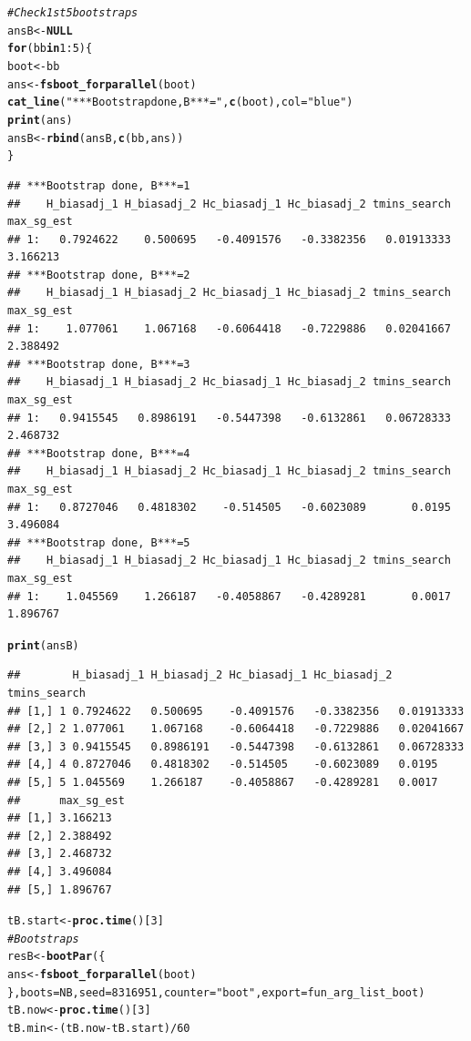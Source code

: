 \documentclass[12pt]{article}
\makeatletter
\newcommand{\hlnum}[1]{\textcolor[rgb]{0.686,0.059,0.569}{#1}}%
\newcommand{\hlstr}[1]{\textcolor[rgb]{0.192,0.494,0.8}{#1}}%
\newcommand{\hlcom}[1]{\textcolor[rgb]{0.678,0.584,0.686}{\textit{#1}}}%
\newcommand{\hlopt}[1]{\textcolor[rgb]{0,0,0}{#1}}%
\newcommand{\hlstd}[1]{\textcolor[rgb]{0.345,0.345,0.345}{#1}}%
\newcommand{\hlkwa}[1]{\textcolor[rgb]{0.161,0.373,0.58}{\textbf{#1}}}%
\newcommand{\hlkwb}[1]{\textcolor[rgb]{0.69,0.353,0.396}{#1}}%
\newcommand{\hlkwc}[1]{\textcolor[rgb]{0.333,0.667,0.333}{#1}}%
\newcommand{\hlkwd}[1]{\textcolor[rgb]{0.737,0.353,0.396}{\textbf{#1}}}%
\newenvironment{kframe}{%
 \def\at@end@of@kframe{}%
 \ifinner\ifhmode%
  \def\at@end@of@kframe{\end{minipage}}%
  \begin{minipage}{\columnwidth}%
 \fi\fi%
 \def\FrameCommand##1{\hskip\@totalleftmargin \hskip-\fboxsep
 \colorbox{shadecolor}{##1}\hskip-\fboxsep
     \hskip-\linewidth \hskip-\@totalleftmargin \hskip\columnwidth}%
 \MakeFramed {\advance\hsize-\width
   \@totalleftmargin\z@ \linewidth\hsize
   \@setminipage}}%
 {\par\unskip\endMakeFramed%
 \at@end@of@kframe}
\newenvironment{knitrout}{}{} %
\makeatother
\begin{document}
\begin{knitrout}
\begin{kframe}
\begin{alltt}
\hlcom{# Check 1st 5 bootstraps}
\hlstd{ansB} \hlkwb{<-} \hlkwa{NULL}
\hlkwa{for} \hlstd{(bb} \hlkwa{in} \hlnum{1}\hlopt{:}\hlnum{5}\hlstd{) \{}
    \hlstd{boot} \hlkwb{<-} \hlstd{bb}
    \hlstd{ans} \hlkwb{<-} \hlkwd{fsboot_forparallel}\hlstd{(boot)}
    \hlkwd{cat_line}\hlstd{(}\hlstr{"***Bootstrap done, B***="}\hlstd{,} \hlkwd{c}\hlstd{(boot),} \hlkwc{col} \hlstd{=} \hlstr{"blue"}\hlstd{)}
    \hlkwd{print}\hlstd{(ans)}
    \hlstd{ansB} \hlkwb{<-} \hlkwd{rbind}\hlstd{(ansB,} \hlkwd{c}\hlstd{(bb, ans))}
\hlstd{\}}
\end{alltt}
\begin{verbatim}
## ***Bootstrap done, B***=1
##    H_biasadj_1 H_biasadj_2 Hc_biasadj_1 Hc_biasadj_2 tmins_search max_sg_est
## 1:   0.7924622    0.500695   -0.4091576   -0.3382356   0.01913333   3.166213
## ***Bootstrap done, B***=2
##    H_biasadj_1 H_biasadj_2 Hc_biasadj_1 Hc_biasadj_2 tmins_search max_sg_est
## 1:    1.077061    1.067168   -0.6064418   -0.7229886   0.02041667   2.388492
## ***Bootstrap done, B***=3
##    H_biasadj_1 H_biasadj_2 Hc_biasadj_1 Hc_biasadj_2 tmins_search max_sg_est
## 1:   0.9415545   0.8986191   -0.5447398   -0.6132861   0.06728333   2.468732
## ***Bootstrap done, B***=4
##    H_biasadj_1 H_biasadj_2 Hc_biasadj_1 Hc_biasadj_2 tmins_search max_sg_est
## 1:   0.8727046   0.4818302    -0.514505   -0.6023089       0.0195   3.496084
## ***Bootstrap done, B***=5
##    H_biasadj_1 H_biasadj_2 Hc_biasadj_1 Hc_biasadj_2 tmins_search max_sg_est
## 1:    1.045569    1.266187   -0.4058867   -0.4289281       0.0017   1.896767
\end{verbatim}
\begin{alltt}
\hlkwd{print}\hlstd{(ansB)}
\end{alltt}
\begin{verbatim}
##        H_biasadj_1 H_biasadj_2 Hc_biasadj_1 Hc_biasadj_2 tmins_search
## [1,] 1 0.7924622   0.500695    -0.4091576   -0.3382356   0.01913333  
## [2,] 2 1.077061    1.067168    -0.6064418   -0.7229886   0.02041667  
## [3,] 3 0.9415545   0.8986191   -0.5447398   -0.6132861   0.06728333  
## [4,] 4 0.8727046   0.4818302   -0.514505    -0.6023089   0.0195      
## [5,] 5 1.045569    1.266187    -0.4058867   -0.4289281   0.0017      
##      max_sg_est
## [1,] 3.166213  
## [2,] 2.388492  
## [3,] 2.468732  
## [4,] 3.496084  
## [5,] 1.896767
\end{verbatim}
\begin{alltt}
\hlstd{tB.start} \hlkwb{<-} \hlkwd{proc.time}\hlstd{()[}\hlnum{3}\hlstd{]}
\hlcom{# Bootstraps}
\hlstd{resB} \hlkwb{<-} \hlkwd{bootPar}\hlstd{(\{}
    \hlstd{ans} \hlkwb{<-} \hlkwd{fsboot_forparallel}\hlstd{(boot)}
\hlstd{\},} \hlkwc{boots} \hlstd{= NB,} \hlkwc{seed} \hlstd{=} \hlnum{8316951}\hlstd{,} \hlkwc{counter} \hlstd{=} \hlstr{"boot"}\hlstd{,} \hlkwc{export} \hlstd{= fun_arg_list_boot)}
\hlstd{tB.now} \hlkwb{<-} \hlkwd{proc.time}\hlstd{()[}\hlnum{3}\hlstd{]}
\hlstd{tB.min} \hlkwb{<-} \hlstd{(tB.now} \hlopt{-} \hlstd{tB.start)}\hlopt{/}\hlnum{60}


\end{alltt}
\end{kframe}
\end{knitrout}
\end{document}
